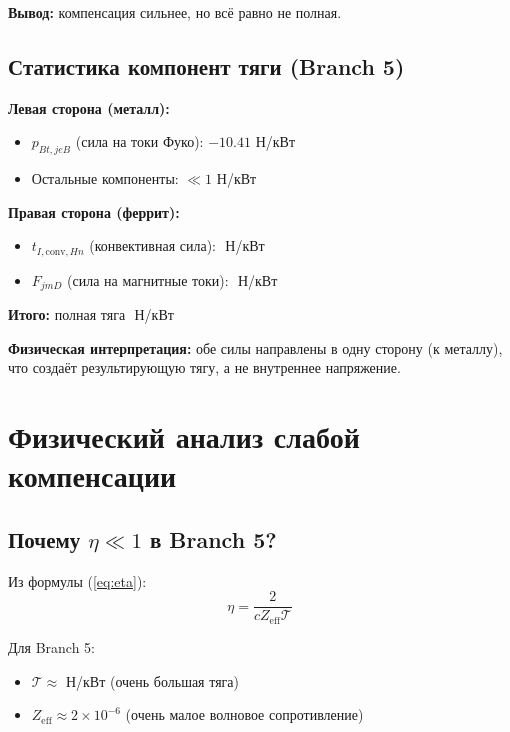 \documentclass[a4paper,12pt]{article}
\begin{document}
\textbf{Вывод:} компенсация сильнее, но всё равно не полная.

\subsection{Статистика компонент тяги (Branch 5)}

\textbf{Левая сторона (металл):}
\begin{itemize}
    \item $p_{Bt,jeB}$ (сила на токи Фуко): $-10.41$ Н/кВт
    \item Остальные компоненты: $\ll 1$ Н/кВт
\end{itemize}

\textbf{Правая сторона (феррит):}
\begin{itemize}
    \item $t_{I,\text{conv},Hn}$ (конвективная сила): $ $ Н/кВт
    \item $F_{jmD}$ (сила на магнитные токи): $ $ Н/кВт
\end{itemize}

\textbf{Итого:} полная тяга $ $ Н/кВт

\textbf{Физическая интерпретация:} обе силы направлены в одну сторону
(к металлу), что создаёт результирующую тягу, а не внутреннее напряжение.

\section{Физический анализ слабой компенсации}

\subsection{Почему $\eta \ll 1$ в Branch 5?}

Из формулы (\ref{eq:eta}):
\begin{equation}
\eta = \frac{2}{c Z_{\text{eff}} \mathcal{T}}
\end{equation}

Для Branch 5:
\begin{itemize}
    \item $\mathcal{T} \approx $ Н/кВт (очень большая тяга)
    \item $Z_{\text{eff}} \approx 2 \times 10^{-6}$ (очень малое волновое
    сопротивление)
\end{itemize}

\end{document}
